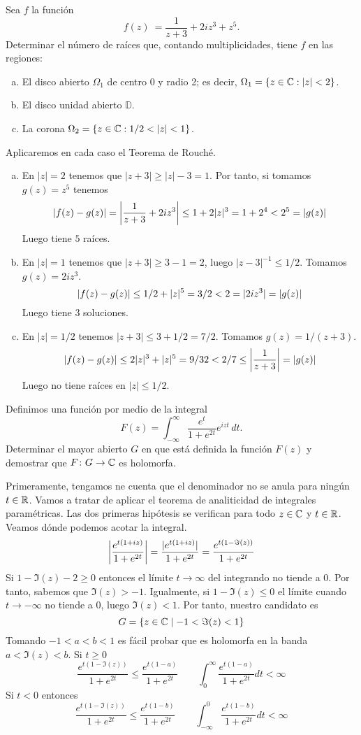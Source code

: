 \documentclass[twoside]{article}
\begin{document}
\newpage
\begin{ejercicio}{4}
Sea $f$ la función
\[ f(z)\ =\frac{1}{z + 3}+2iz^3+z^5.\]
Determinar el número de raíces que,
contando multiplicidades, tiene $f$ en las regiones:
\begin{enumerate}[a)]
\item El disco abierto $\Omega_1$ de centro 0 y radio 2; es decir, $\Omega_1=\{z\in\mathbb{C} : |z| < 2\}$.
\item El disco unidad abierto $\mathbb{D}$. 
\item La corona $\Omega_2=\{z\in\mathbb{C} : 1/2 < |z| < 1\}$.
\end{enumerate}
\end{ejercicio}
\begin{solucion}
Aplicaremos en cada caso el Teorema de Rouché.
\begin{enumerate}[a)]
\item En $|z|=2$ tenemos que $|z+3|\geq |z|-3 = 1$. Por tanto, si tomamos $g(z)=z^5$ tenemos
$$
|f(z)-g(z)| = \left\lvert\frac{1}{z+3}+2iz^3\right\rvert \leq 1 + 2|z|^3 = 1+2^4 < 2^5 = |g(z)|
$$
Luego tiene $5$ raíces.
\item En $|z|=1$ tenemos que $|z+3| \geq 3-1 = 2$, luego $|z-3|^{-1}\leq 1/2$. Tomamos $g(z)=2iz^3$.
$$
\left\lvert f(z)-g(z)\right\rvert \leq 1/2+|z|^5 = 3/2 < 2 = |2iz^3|  = |g(z)|
$$
Luego tiene 3 soluciones. 
\item En $|z|=1/2$ tenemos $|z+3| \leq 3+1/2 = 7/2 $.  Tomamos $g(z)=1/(z+3)$.
$$
\left\lvert f(z)-g(z)\right\rvert \leq 2|z|^3+|z|^5 = 9/32 < 2/7 \leq \left\lvert\frac{1}{z+3}\right\rvert = |g(z)|
$$
Luego no tiene raíces en $|z|\leq 1/2$.
\end{enumerate}
\end{solucion}

\newpage
\begin{ejercicio}{5}
Definimos una función por medio de la integral
\[F(z)=\int_{-\infty}^\infty \frac{e^t}{1+e^{2t}}e^{izt}\,dt.\]
Determinar el mayor abierto $G$ en que está definida la función $F(z)$ y demostrar que $F\colon G\to \mathbb{C}$ es holomorfa. 
\end{ejercicio}
\begin{solucion}
Primeramente, tengamos ne cuenta que el denominador no se anula para ningún $t\in \mathbb{R}$. Vamos a tratar de aplicar el teorema de analiticidad de integrales paramétricas. Las dos primeras hipótesis se verifican para todo $z\in \mathbb{C}$ y $t\in \mathbb{R}$. Veamos dónde podemos acotar la integral.
$$
\left\lvert\frac{e^{t(1+iz)}}{1+e^{2t}}\right\rvert = \frac{|e^{t(1+iz)}|}{1+e^{2t}} = \frac{e^{t(1-\Im(z))}}{1+e^{2t}}
$$
Si $1-\Im(z)-2\geq 0$ entonces el límite $t\to\infty$ del integrando no tiende a $0$. Por tanto, sabemos que $\Im(z)>-1$. Igualmente, si $1-\Im(z)\leq0$ el límite cuando $t\to-\infty$ no tiende a $0$, luego $\Im(z)<1$. Por tanto, nuestro candidato es
$$
G = \{z \in \mathbb{C} \mid -1 < \Im(z)<1\}
$$
Tomando $-1<a<b<1$ es fácil probar que es holomorfa en la banda $a<\Im(z)<b$. Si $t\geq 0$
$$
 \frac{e^{t(1-\Im(z))}}{1+e^{2t}} \leq \frac{e^{t(1-a)}}{1+e^{2t}} \qquad \int_0^\infty \frac{e^{t(1-a)}}{1+e^{2t}} dt < \infty 
$$
Si $t<0$ entonces
$$
 \frac{e^{t(1-\Im(z))}}{1+e^{2t}} \leq \frac{e^{t(1-b)}}{1+e^{2t}} \qquad \int_{-\infty}^0 \frac{e^{t(1-b)}}{1+e^{2t}} dt < \infty
$$
\end{solucion}
\end{document}
